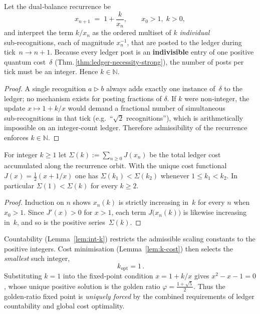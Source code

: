 \begin{lemma}
\label{lem:int-k}
Let the dual‑balance recurrence be 
\[
  x_{n+1}\;=\;1+\frac{k}{x_n},
  \qquad x_0>1,\;k>0,
\]
and interpret the term $k/x_n$ as the ordered multiset of $k$
\emph{individual} sub‑recognitions, each of magnitude $x_n^{-1}$,
that are posted to the ledger during tick $n\!\to\!n{+}1$.
Because every ledger post is an \textbf{indivisible} entry of one
positive quantum cost \(\delta\) 
(Thm.\,\ref{thm:ledger-necessity-strong}),
the number of posts per tick must be an integer.
Hence \(k\in\mathbb N\).
\end{lemma}

\begin{proof}
A single recognition $a\triangleright b$ always adds exactly one
instance of $\delta$ to the ledger; no mechanism exists for posting
fractions of $\delta$.  
If $k$ were non‑integer, the update
$x\mapsto1+k/x$ would demand a fractional number of simultaneous
sub‑recognitions in that tick
(e.g.\ “$\sqrt2$ recognitions”), which is arithmetically impossible
on an integer‑count ledger.
Therefore admissibility of the recurrence enforces \(k\in\mathbb N\).
\end{proof}

\begin{lemma}
\label{lem:k-cost}
For integer \(k\ge1\) let
\(
  \Sigma(k):=\sum_{n\ge0} J(x_n)
\)
be the total ledger cost accumulated along the recurrence orbit.
With the unique cost functional
\(J(x)=\tfrac12(x+1/x)\)
one has
\(
  \Sigma(k_1)<\Sigma(k_2)
\)
whenever \(1\le k_1<k_2\).
In particular \(\Sigma(1)<\Sigma(k)\) for every \(k\ge2\).
\end{lemma}

\begin{proof}
Induction on \(n\) shows \(x_n(k)\) is strictly increasing in \(k\)
for every \(n\) when \(x_0>1\).
Since \(J'(x)>0\) for \(x>1\), each term
\(J\!\bigl(x_n(k)\bigr)\) is likewise increasing in \(k\),
and so is the positive series \(\Sigma(k)\).
\end{proof}

\begin{theorem}
\label{thm:k=1}
Countability (Lemma \ref{lem:int-k}) restricts the admissible
scaling constants to the positive integers.
Cost minimisation (Lemma \ref{lem:k-cost}) then selects the
\emph{smallest} such integer,
\[
  \boxed{\,k_{\text{opt}} = 1\,}.
\]
Substituting \(k=1\) into the fixed‑point condition
\(x=1+k/x\) gives
\(
  x^{2}-x-1=0
\),
whose unique positive solution is the golden ratio
\(
  \displaystyle
  \varphi=\frac{1+\sqrt5}{2}.
\)
Thus the golden‑ratio fixed point is \emph{uniquely forced} by the
combined requirements of ledger countability and global
cost optimality.
\end{theorem}

